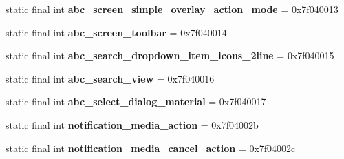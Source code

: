 \begin{DoxyCompactItemize}
\item 
\hypertarget{classandroid_1_1support_1_1v7_1_1appcompat_1_1_r_1_1layout_acc248e0178ddf81d8ec0eb5056424a5d}{}static final int {\bfseries abc\+\_\+screen\+\_\+simple\+\_\+overlay\+\_\+action\+\_\+mode} = 0x7f040013\label{classandroid_1_1support_1_1v7_1_1appcompat_1_1_r_1_1layout_acc248e0178ddf81d8ec0eb5056424a5d}

\item 
\hypertarget{classandroid_1_1support_1_1v7_1_1appcompat_1_1_r_1_1layout_addd57f53331cb1ff5fd2c53e61bf2805}{}static final int {\bfseries abc\+\_\+screen\+\_\+toolbar} = 0x7f040014\label{classandroid_1_1support_1_1v7_1_1appcompat_1_1_r_1_1layout_addd57f53331cb1ff5fd2c53e61bf2805}

\item 
\hypertarget{classandroid_1_1support_1_1v7_1_1appcompat_1_1_r_1_1layout_a43434db42002b5872fd031eaaea46488}{}static final int {\bfseries abc\+\_\+search\+\_\+dropdown\+\_\+item\+\_\+icons\+\_\+2line} = 0x7f040015\label{classandroid_1_1support_1_1v7_1_1appcompat_1_1_r_1_1layout_a43434db42002b5872fd031eaaea46488}

\item 
\hypertarget{classandroid_1_1support_1_1v7_1_1appcompat_1_1_r_1_1layout_a424314fba766e6fc9c6e6b71ccc00fff}{}static final int {\bfseries abc\+\_\+search\+\_\+view} = 0x7f040016\label{classandroid_1_1support_1_1v7_1_1appcompat_1_1_r_1_1layout_a424314fba766e6fc9c6e6b71ccc00fff}

\item 
\hypertarget{classandroid_1_1support_1_1v7_1_1appcompat_1_1_r_1_1layout_a1f6651d158db2337019984ab97f60e22}{}static final int {\bfseries abc\+\_\+select\+\_\+dialog\+\_\+material} = 0x7f040017\label{classandroid_1_1support_1_1v7_1_1appcompat_1_1_r_1_1layout_a1f6651d158db2337019984ab97f60e22}

\item 
\hypertarget{classandroid_1_1support_1_1v7_1_1appcompat_1_1_r_1_1layout_a07b16aa60214e640ee520c3949ca8ebf}{}static final int {\bfseries notification\+\_\+media\+\_\+action} = 0x7f04002b\label{classandroid_1_1support_1_1v7_1_1appcompat_1_1_r_1_1layout_a07b16aa60214e640ee520c3949ca8ebf}

\item 
\hypertarget{classandroid_1_1support_1_1v7_1_1appcompat_1_1_r_1_1layout_a4942be2a18b0c69205d2f039f4cfb25d}{}static final int {\bfseries notification\+\_\+media\+\_\+cancel\+\_\+action} = 0x7f04002c\label{classandroid_1_1support_1_1v7_1_1appcompat_1_1_r_1_1layout_a4942be2a18b0c69205d2f039f4cfb25d}


\end{DoxyCompactItemize}
